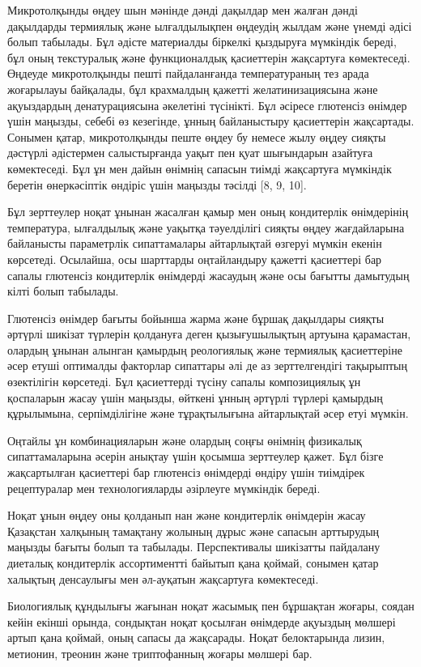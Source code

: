 Микротолқынды өңдеу шын мәнінде дәнді дақылдар мен жалған дәнді
дақылдарды термиялық және ылғалдылықпен өңдеудің жылдам және үнемді
әдісі болып табылады. Бұл әдісте материалды біркелкі қыздыруға мүмкіндік
береді, бұл оның текстуралық және функционалдық қасиеттерін жақсартуға
көмектеседі. Өңдеуде микротолқынды пешті пайдаланғанда температураның
тез арада жоғарылауы байқалады, бұл крахмалдың қажетті желатинизациясына
және ақуыздардың денатурациясына әкелетіні түсінікті. Бұл әсіресе
глютенсіз өнімдер үшін маңызды, себебі өз кезегінде, ұнның байланыстыру
қасиеттерін жақсартады. Сонымен қатар, микротолқынды пеште өңдеу бу
немесе жылу өңдеу сияқты дәстүрлі әдістермен салыстырғанда уақыт пен
қуат шығындарын азайтуға көмектеседі. Бұл ұн мен дайын өнімнің сапасын
тиімді жақсартуға мүмкіндік беретін өнеркәсіптік өндіріс үшін маңызды
тәсілді {[}8, 9, 10{]}.

Бұл зерттеулер ноқат ұнынан жасалған қамыр мен оның кондитерлік
өнімдерінің температура, ылғалдылық және уақытқа тәуелділігі сияқты
өңдеу жағдайларына байланысты параметрлік сипаттамалары айтарлықтай
өзгеруі мүмкін екенін көрсетеді. Осылайша, осы шарттарды оңтайландыру
қажетті қасиеттері бар сапалы глютенсіз кондитерлік өнімдерді жасаудың
және осы бағытты дамытудың кілті болып табылады.

Глютенсіз өнімдер бағыты бойынша жарма және бұршақ дақылдары сияқты
әртүрлі шикізат түрлерін қолдануға деген қызығушылықтың артуына
қарамастан, олардың ұнынан алынган қамырдың реологиялық және термиялық
қасиеттеріне әсер етуші оптималды факторлар сипаттары әлі де аз
зерттелгендігі тақырыптың өзектілігін көрсетеді. Бұл қасиеттерді түсіну
сапалы композициялық ұн қоспаларын жасау үшін маңызды, өйткені ұнның
әртүрлі түрлері қамырдың құрылымына, серпімділігіне және тұрақтылығына
айтарлықтай әсер етуі мүмкін.

Оңтайлы ұн комбинацияларын және олардың соңғы өнімнің физикалық
сипаттамаларына әсерін анықтау үшін қосымша зерттеулер қажет. Бұл бізге
жақсартылған қасиеттері бар глютенсіз өнімдерді өндіру үшін тиімдірек
рецептуралар мен технологияларды әзірлеуге мүмкіндік береді.

Ноқат ұнын өңдеу оны қолданып нан және кондитерлік өнімдерін жасау
Қазақстан халқының тамақтану жолының дұрыс және сапасын арттырудың
маңызды бағыты болып та табылады. Перспективалы шикізатты пайдалану
диеталық кондитерлік ассортиментті байытып қана қоймай, сонымен қатар
халықтың денсаулығы мен әл-ауқатын жақсартуға көмектеседі.

Биологиялық құндылығы жағынан ноқат жасымық пен бұршақтан жоғары, соядан
кейін екінші орында, сондықтан ноқат қосылған өнімдерде ақуыздың мөлшері
артып қана қоймай, оның сапасы да жақсарады. Ноқат белоктарында лизин,
метионин, треонин және триптофанның жоғары мөлшері бар.

